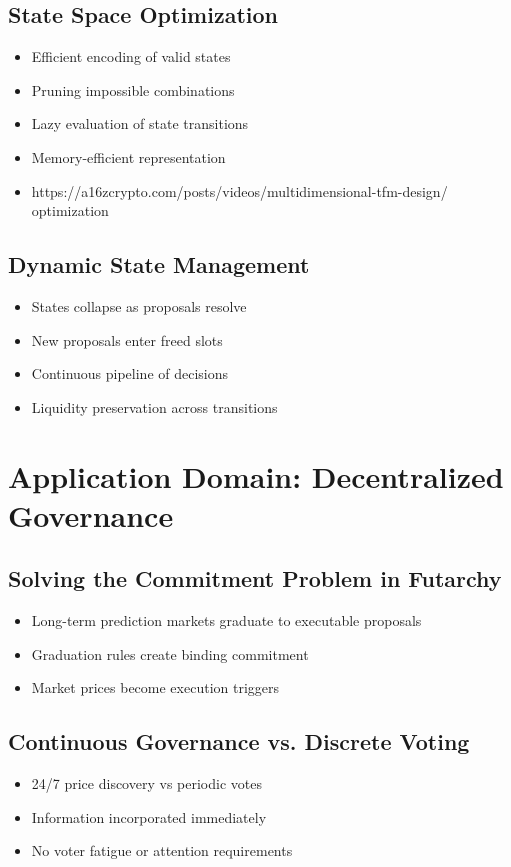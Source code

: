 \documentclass{article}
\begin{document}
\subsection{State Space Optimization}
\begin{itemize}
    \item Efficient encoding of valid states
    \item Pruning impossible combinations
    \item Lazy evaluation of state transitions
    \item Memory-efficient representation
    \item https://a16zcrypto.com/posts/videos/multidimensional-tfm-design/ optimization
\end{itemize}

\subsection{Dynamic State Management}
\begin{itemize}
    \item States collapse as proposals resolve
    \item New proposals enter freed slots
    \item Continuous pipeline of decisions
    \item Liquidity preservation across transitions
\end{itemize}

\section{Application Domain: Decentralized Governance}
\subsection{Solving the Commitment Problem in Futarchy}
\begin{itemize}
   \item Long-term prediction markets graduate to executable proposals
   \item Graduation rules create binding commitment
   \item Market prices become execution triggers
\end{itemize}

\subsection{Continuous Governance vs. Discrete Voting}
\begin{itemize}
   \item 24/7 price discovery vs periodic votes
   \item Information incorporated immediately
   \item No voter fatigue or attention requirements
\end{itemize}
\end{document}
